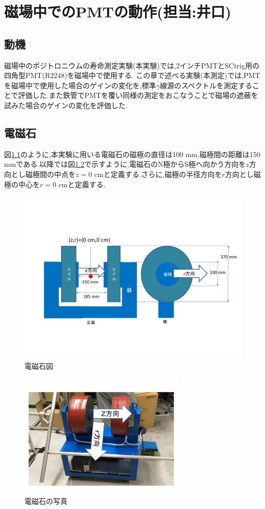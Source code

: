 \chapter{磁場中でのPMTの動作(担当:井口)}\label{PMT}


\section{動機}
磁場中のポジトロニウムの寿命測定実験(本実験)では,2インチPMTとSCtrig用の四角型PMT(R2248)\cite{pmtR2248}を磁場中で使用する.
この章で述べる実験(本測定)では,PMTを磁場中で使用した場合のゲインの変化を,標準$\gamma$線源のスペクトルを測定することで評価した.また鉄管でPMTを覆い同様の測定をおこなうことで磁場の遮蔽を試みた場合のゲインの変化を評価した.


\section{電磁石}
図\ref{magfigure}のように,本実験に用いる電磁石の磁極の直径は100 mm,磁極間の距離は150 mmである.以降では図\ref{magphoto}で示すように,電磁石のN極からS極へ向かう方向を$z$方向とし磁極間の中点を$z=0$ cmと定義する.さらに,磁極の半径方向を$r$方向とし磁極の中心を$r=0$ cmと定義する.
\begin{figure}[tbp]
	\centering
	\includegraphics[width=13cm]{fig/iguchi/magnetfigure.pdf}
	\caption{電磁石図}
	\label{magfigure}
\end{figure}

\begin{figure}[tbp]
	\centering
	\includegraphics[width=8cm]{fig/iguchi/magnetphoto.pdf}
	\caption{電磁石の写真}
	\label{magphoto}
\end{figure}

